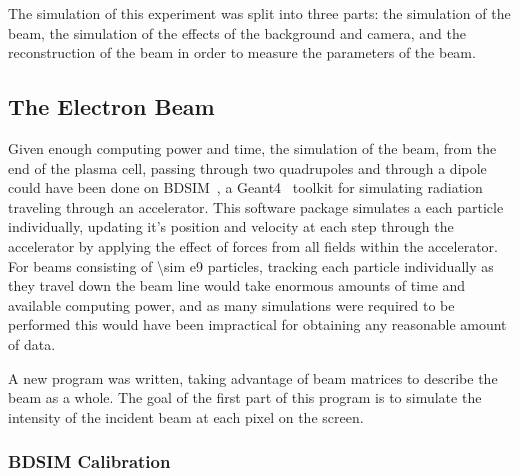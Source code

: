 The simulation of this experiment was split into three parts: the simulation of
the beam, the simulation of the effects of the background and camera, and the
reconstruction of the beam in order to measure the parameters of the beam.

\subsection{The Electron Beam}


Given enough computing power and time, the simulation of the beam, from the end
of the plasma cell, passing through two quadrupoles and through a dipole could
have been done on BDSIM~\cite{agapov2009bdsim}, a
Geant4~\cite{agostinelli2003geant4} toolkit for simulating radiation traveling
through an accelerator. This software package simulates a each particle
individually, updating it's position and velocity at each step through the
accelerator by applying the effect of forces from all fields within the
accelerator.  For beams consisting of \num{\sim e9} particles, tracking each
particle individually as they travel down the beam line would take enormous
amounts of time and available computing power, and as many simulations were
required to be performed this would have been impractical for obtaining any
reasonable amount of data.

A new program was written, taking advantage of beam matrices to describe the
beam as a whole. The goal of the first part of this program is to simulate the
intensity of the incident beam at each pixel on the screen.

\subsubsection{BDSIM Calibration}

